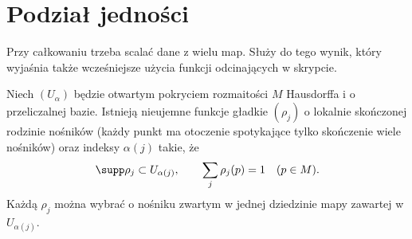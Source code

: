 \section{Podział jedności}
\label{sec:formy-podzial-jednosci}

Przy całkowaniu trzeba scalać dane z wielu map.
Służy do tego wynik, który wyjaśnia także wcześniejsze
użycia funkcji odcinających w skrypcie.

\begin{twierdzenie}
\label{thm:podzial-jednosci-formy}
Niech $(U_\alpha)$ będzie otwartym pokryciem rozmaitości
$M$ Hausdorffa i o przeliczalnej bazie. Istnieją
nieujemne funkcje gładkie $(\rho_j)$ o lokalnie skończonej
rodzinie nośników (każdy punkt ma otoczenie spotykające
tylko skończenie wiele nośników) oraz indeksy $\alpha(j)$ takie, że
\[
 \supp\rho_j\subset U_{\alpha(j)},
 \qquad \sum_j\rho_j(p)=1\quad(p\in M).
\]
Każdą $\rho_j$ można wybrać o nośniku zwartym
w jednej dziedzinie mapy zawartej w $U_{\alpha(j)}$.
\end{twierdzenie}
